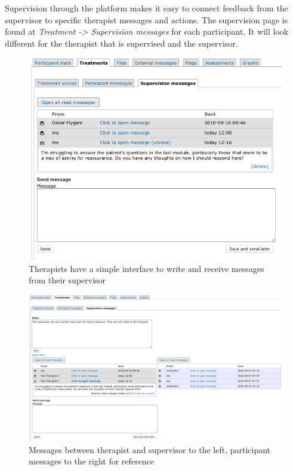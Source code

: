 \documentclass[]{book}
\theoremstyle{definition}
\theoremstyle{definition}
\theoremstyle{definition}
\theoremstyle{remark}
\begin{document}
Supervision through the platform makes it easy to connect feedback from
the supervisor to specific therapist messages and actions. The
supervision page is found at \emph{Treatment -\textgreater{} Supervision
messages} for each participant. It will look different for the therapist
that is supervised and the supervisor.

\begin{figure}
\centering
\includegraphics{images/supervision-therapist.png}
\caption{Therapists have a simple interface to write and receive
messages from their supervisor}
\end{figure}

\begin{figure}
\centering
\includegraphics{images/supervisor-view.png}
\caption{Messages between therapist and supervisor to the left,
participant messages to the right for reference}
\end{figure}
\end{document}
